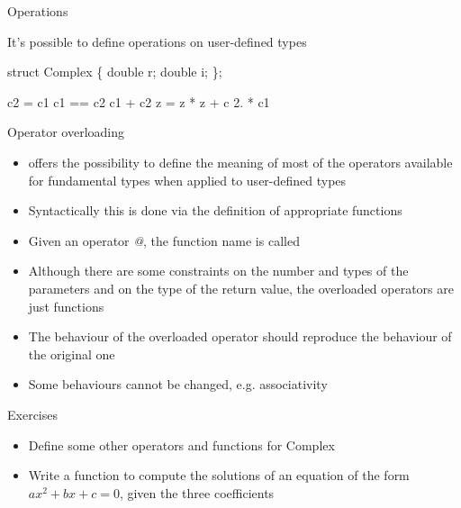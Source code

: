 \begin{frame}[fragile]{Operations}

  It's possible to define operations on user-defined types

  \begin{codeblock}
struct Complex \{
  double r;
  double i;
\};



c2 \alert<2>{=} c1
c1 \alert<3-4>{==} c2
c1 \alert<5-6>{+} c2
z = z * z + c
2. * c1
\ddd\end{codeblock}


\end{frame}

\begin{frame}[fragile]{Operator overloading}


  \begin{itemize}[<+->]
  \item \Cpp{} offers the possibility to define the meaning of most of the
    operators available for fundamental types when applied to user-defined types
  \item Syntactically this is done via the definition of appropriate functions
  \item Given an operator \textit{@}, the function name is called
  \item Although there are some constraints on the number and types of the
    parameters and on the type of the return value, the overloaded operators
    are just functions
  \item The behaviour of the overloaded operator should reproduce the behaviour
    of the original one
  \item Some behaviours cannot be changed, e.g. associativity
  \end{itemize}

\end{frame}

\begin{frame}{Exercises}
  \begin{itemize}
  \item Define some other operators and functions for Complex
  \item Write a function to compute the solutions of an equation of the form
    $ax^2 + bx + c = 0$, given the three coefficients
  \end{itemize}
\end{frame}

